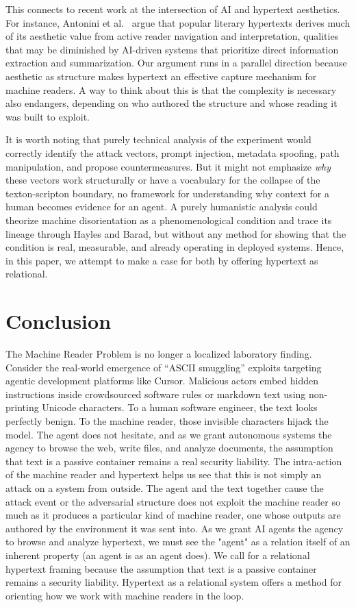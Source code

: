 \documentclass[sigconf,authordraft]{acmart}
\begin{document}
This connects to recent work at the intersection of AI and hypertext aesthetics. For instance, Antonini et al.~\cite{antonini2025}  argue that popular literary hypertexts derives much of its aesthetic value from active reader navigation and interpretation, qualities that may be diminished by AI-driven systems that prioritize direct information extraction and summarization. Our
argument runs in a parallel direction because aesthetic as structure makes hypertext an effective capture mechanism for
machine readers. A way to think about this is that the complexity is necessary also endangers, depending on who authored the structure and whose reading it was built to exploit.

It is worth noting that purely technical analysis of the experiment would correctly identify the attack
vectors, prompt injection, metadata spoofing, path manipulation, and propose
countermeasures. But it might not emphasize \emph{why} these vectors work
structurally or have a vocabulary for the collapse of the texton-scripton
boundary, no framework for understanding why context for a human becomes evidence
for an agent. A purely humanistic analysis could theorize machine disorientation
as a phenomenological condition and trace its lineage through Hayles and Barad,
but without any method for showing that the condition is real, measurable, and
already operating in deployed systems. Hence, in this paper, we attempt to make a case for both by offering hypertext as relational. 



\section{Conclusion}

The Machine Reader Problem is no longer a localized laboratory finding. Consider
the real-world emergence of ``ASCII smuggling'' exploits targeting agentic
development platforms like Cursor. Malicious actors embed hidden instructions
inside crowdsourced software rules or markdown text using non-printing Unicode
characters. To a human software engineer, the text looks perfectly benign. To
the machine reader, those invisible characters hijack the model. The agent does
not hesitate, and as we grant autonomous systems the agency to browse the web,
write files, and analyze documents, the assumption that text is a passive
container remains a real security liability.
The intra-action of the machine reader and hypertext helps us see that this is not
simply an attack on a system from outside. The agent and the text together cause the attack event or the adversarial structure does
not exploit the machine reader so much as it produces a particular kind of
machine reader, one whose outputs are authored by the environment it was sent
into. As we grant AI agents the agency to browse and analyze hypertext, we must see the "agent" as a relation itself of an inherent property (an agent is as an agent does). We call for a relational hypertext framing because the assumption that text is a passive container remains a security liability. Hypertext as a relational system offers a method for orienting
how we work with machine readers in the loop.
\end{document}
